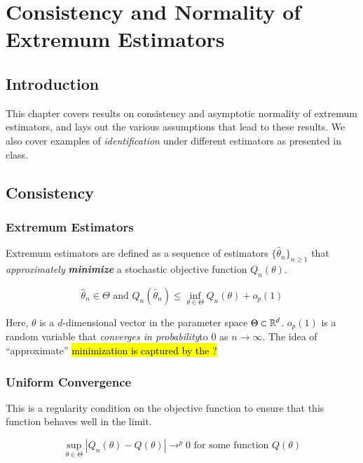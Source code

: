 \documentclass[../main.tex]{subfiles}
\begin{document}
 
\chapter{Consistency and Normality of Extremum Estimators} 

\section{Introduction}
This chapter covers results on consistency and asymptotic normality of extremum estimators, and lays out the various assumptions that lead to these results. We also cover examples of \emph{identification} under different estimators as presented in class.

\section{Consistency}

\subsection{Extremum Estimators}
Extremum estimators are defined as a sequence of estimators $\{\hat{\theta}_n\}_{n \geq 1}$ that \emph{approximately} \textbf{\emph{minimize}} a stochastic objective function $Q_n(\theta)$.
\begin{ass}[EE]\label{ass:A1}
	$$\hat{\theta}_n \in \Theta \text{ and } Q_n(\hat{\theta}_n) \leq \inf_{\theta \in \Theta} Q_n(\theta) + o_p(1)$$
\end{ass}


Here, $\theta$ is a $d$-dimensional vector in the parameter space $\Theta \subset \operatorname{\mathbb{R}}^d$. $o_p(1)$ is a random variable that \emph{converges in probability}\footnotemark to 0 as $n \to \infty$. The idea of ``approximate'' \hl{minimization is captured by the ?}


\subsection{Uniform Convergence}

This is a regularity condition on the objective function to ensure that this function behaves well in the limit. 
\begin{ass}[UCONV]\label{ass:A2}
	$$\sup_{\theta \in \Theta} |Q_n(\theta) - Q(\theta)| \to ^p 0 \text{ for some function } Q(\theta)$$
\end{ass}
\end{document}
